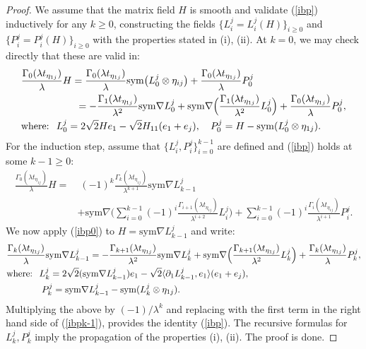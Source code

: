 \documentclass[reqno,twoside,11pt]{amsart}
\newcommand{\sym}{\mathrm{sym}}
\numberwithin{equation}{section}
\theoremstyle{plain}
\theoremstyle{definition}
\begin{document}
\begin{proof}
We assume that the matrix field $H$ is smooth and 
validate (\ref{ibp}) inductively for any $k\geq 0$, constructing the fields
$\{L_i^j =L_i^j(H)\}_{i\geq 0}$ and $\{P_i^j=P_i^j(H)\}_{i\geq 0}$ with the properties stated in (i), (ii). 
At $k=0$, we may check directly that these are valid in:
\begin{equation}\label{ibp0}
\begin{split}
& \frac{\Gamma_0(\lambda t_{\eta_{1j}})}{\lambda}H = \frac{\Gamma_0(\lambda t_{\eta_{1j}})}{\lambda}
\sym\big(L_0^{j}\otimes\eta_{ij}\big) + \frac{\Gamma_0(\lambda t_{\eta_{1j}})}{\lambda}P_0^j
\\ & \hspace{1.95cm} 
= -\frac{\Gamma_{1}(\lambda t_{\eta_{1j}})}{\lambda^{2}} \sym\nabla L^{j}_0  + \sym\nabla
\Big(\frac{\Gamma_{1}(\lambda t_{\eta_{1j}})}{\lambda^{2}}L_0^j\Big) 
+ \frac{\Gamma_0(\lambda t_{\eta_{1j}})}{\lambda} P_0^j, \\
& \mbox{where: } \;  L_0^j = 2\sqrt{2}He_1 - \sqrt{2}H_{11}(e_1+e_j),
\quad P_0^j = H-\sym(L_0^j\otimes \eta_{1j}).
\end{split}
\end{equation}
For the induction step, assume that $\{L_i^j, P_i^j\}_{i=0}^{k-1}$
are defined and (\ref{ibp}) holds at some $k-1\geq 0$:
\begin{equation}\label{ibpk-1}
\begin{split}
\frac{\Gamma_0(\lambda t_{\eta_{1j}})}{\lambda}H = & \; (-1)^{k}\frac{\Gamma_{k}(\lambda
  t_{\eta_{1j}})}{\lambda^{k+1}} \sym\nabla L^{j}_{k-1}  \\ & + \sym\nabla
\Big(\sum_{i=0}^{k-1}(-1)^i\frac{\Gamma_{i+1}(\lambda t_{\eta_{1j}})}{\lambda^{i+2}}L_i^j\Big) 
+ \sum_{i=0}^{k-1}(-1)^i\frac{\Gamma_i(\lambda t_{\eta_{1j}})}{\lambda^{i+1}} P_i^j.
\end{split}
\end{equation}
We now apply (\ref{ibp0}) to $H=\sym\nabla L_{k-1}^j$ and write:
\begin{equation*}
\begin{split}
& \frac{\Gamma_k(\lambda t_{\eta_{1j}})}{\lambda} \sym\nabla L_{k-1}^j
= -\frac{\Gamma_{k+1}(\lambda t_{\eta_{1j}})}{\lambda^{2}} \sym\nabla
L^{j}_k  + \sym\nabla
\Big(\frac{\Gamma_{k+1}(\lambda t_{\eta_{1j}})}{\lambda^{2}}L_k^j\Big) 
+ \frac{\Gamma_k(\lambda t_{\eta_{1j}})}{\lambda} P_k^j, \\
& \mbox{where: } \;  L_k^j = 2\sqrt{2}(\sym\nabla L_{k-1}^j)e_1 -
\sqrt{2}\langle \partial_1L_{k-1}^j, e_1\rangle (e_1+e_j), \\ & 
\hspace{1.35cm} P_k^j = \sym\nabla L_{k-1}^j - \sym(L_k^j\otimes \eta_{1j}).
\end{split}
\end{equation*}
Multiplying the above by $(-1)/\lambda^k$ and replacing with the
first term in the right hand side of (\ref{ibpk-1}), provides the
identity (\ref{ibp}). The recursive formulas for $L_k^j, P_k^j$ imply
the propagation of the properties (i), (ii). The proof is done. 
\end{proof}
\end{document}
